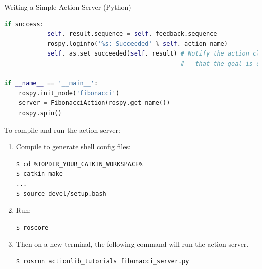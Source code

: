 \begin{frame}{Writing a Simple Action Server (Python)}
\begin{lstlisting}[language=python]
        if success:
            self._result.sequence = self._feedback.sequence
            rospy.loginfo('%s: Succeeded' % self._action_name)
            self._as.set_succeeded(self._result) # Notify the action client 
                                                 #   that the goal is complete.

if __name__ == '__main__':
    rospy.init_node('fibonacci')
    server = FibonacciAction(rospy.get_name())
    rospy.spin()
\end{lstlisting} 

\framebreak
To compile and run the action server:
 \begin{enumerate}
  \item Compile to generate shell config files:
\begin{lstlisting}[language=shell]  
$ cd %TOPDIR_YOUR_CATKIN_WORKSPACE%
$ catkin_make
...
$ source devel/setup.bash
\end{lstlisting} 
  \item Run:
\begin{lstlisting}[language=shell]  
$ roscore
\end{lstlisting} 
  \item Then on a new terminal, the following command will run the action server.
\begin{lstlisting}[language=shell]  
$ rosrun actionlib_tutorials fibonacci_server.py
\end{lstlisting} 
 \end{enumerate}
\end{frame}

